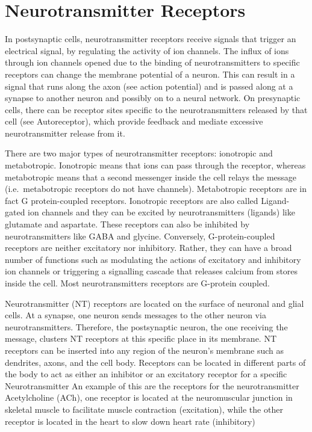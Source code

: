 \hypertarget{neurotransmitter-receptors}{%
\section{Neurotransmitter Receptors}\label{neurotransmitter-receptors}}

In postsynaptic cells, neurotransmitter receptors receive signals that trigger an electrical signal, by regulating the activity of ion channels. The influx of ions through ion channels opened due to the binding of neurotransmitters to specific receptors can change the membrane potential of a neuron. This can result in a signal that runs along the axon (see action potential) and is passed along at a synapse to another neuron and possibly on to a neural network. On presynaptic cells, there can be receptor sites specific to the neurotransmitters released by that cell (see Autoreceptor), which provide feedback and mediate excessive neurotransmitter release from it.

There are two major types of neurotransmitter receptors: ionotropic and metabotropic. Ionotropic means that ions can pass through the receptor, whereas metabotropic means that a second messenger inside the cell relays the message (i.e.~metabotropic receptors do not have channels). Metabotropic receptors are in fact G protein-coupled receptors. Ionotropic receptors are also called Ligand-gated ion channels and they can be excited by neurotransmitters (ligands) like glutamate and aspartate. These receptors can also be inhibited by neurotransmitters like GABA and glycine. Conversely, G-protein-coupled receptors are neither excitatory nor inhibitory. Rather, they can have a broad number of functions such as modulating the actions of excitatory and inhibitory ion channels or triggering a signalling cascade that releases calcium from stores inside the cell. Most neurotransmitters receptors are G-protein coupled.

Neurotransmitter (NT) receptors are located on the surface of neuronal and glial cells. At a synapse, one neuron sends messages to the other neuron via neurotransmitters. Therefore, the postsynaptic neuron, the one receiving the message, clusters NT receptors at this specific place in its membrane. NT receptors can be inserted into any region of the neuron's membrane such as dendrites, axons, and the cell body. Receptors can be located in different parts of the body to act as either an inhibitor or an excitatory receptor for a specific Neurotransmitter An example of this are the receptors for the neurotransmitter Acetylcholine (ACh), one receptor is located at the neuromuscular junction in skeletal muscle to facilitate muscle contraction (excitation), while the other receptor is located in the heart to slow down heart rate (inhibitory)

